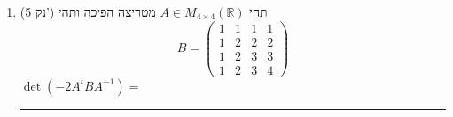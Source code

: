 \documentclass[12pt, a4paper]{article}
\newcommand{\rr}{\mathbb{R}}
\newcommand{\points}[1]{(#1 נק') }
\begin{document}
\begin{enumerate}
פתרון:
נרצה למצוא את החיתוך בין המישורים (שגילו לנו כי זה יוצא ישר): החיתוך נתון לנו על ידי
$$\{(x,y,z): x=1+4z, y=3z-2\}=\{(1+4z, 3z-2,z):z\in\rr\}$$
והרי זוהי הצגה פרמטרית של ישר העובר בנקודה
$(1,-2,0)$
עם וקטור כיוון
$(4,3,1)$.
הנה שתי דרכים לסיים את התרגיל:

$\bullet$
ניתן להציב את הנקודה
$(1,-2,0)$
ולראות כי שייכת רק לשניים מהמישורים. בנוסף, הכיוון
$(4,3,1)$
אמור להיות מאונך לנורמל של המישור, 
וזה אכן נכון כאשר הנורמל הוא
$(1,-1,-1)$,
או שהנורמל הוא
$(5,-3,-11)$,
אבל לא כאשר הוא 
$(1,-4,-1)$
או
$(2,1,0)$,
לכן שני מישורים נפסלים.
המישור היחיד שעומד בשני הקריטריונים הוא
המישור הנתון על ידי המשוואה
$5x-3y-11z=11$.

$\bullet$
 נציב את הנקודה הכללית מהישר שמצאנו בתוך כל אחת מהמשוואות של המישורים הנתונים, ונוודא כי אחת תמיד מתקיימת, כאשר האחרות לא.
 
\noindent\rule{\textwidth-30pt}{0.4pt}

\item\points{5}
תהי 
$A\in M_{4\times 4}(\rr)$
מטריצה הפיכה ותהי
\[
B=
\begin{pmatrix}
    1 & 1 & 1 & 1 \\
    1 & 2 & 2 & 2 \\
    1 & 2 & 3 & 3 \\
    1 & 2 & 3 & 4
\end{pmatrix}
\]
$\det(-2A^tBA^{-1})=$
\begin{enumerate}
\end{enumerate}


\noindent\rule{\textwidth-30pt}{0.4pt}



\end{enumerate}
\end{document}
